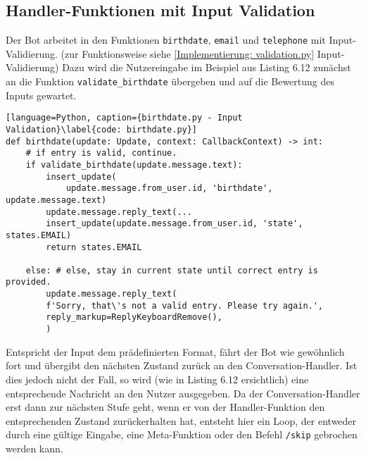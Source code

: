         \subsection{Handler-Funktionen mit Input Validation} \label{Implementierung: handler validation}
            Der Bot arbeitet in den Funktionen \verb|birthdate|, \verb|email| und \verb|telephone| mit Input-Validierung. (zur Funktionsweise siehe \ref{Implementierung: validation.py} Input-Validierung) Dazu wird die Nutzereingabe im Beispiel aus Listing 6.12 zunächst an die Funktion \verb|validate_birthdate| übergeben und auf die Bewertung des Inputs gewartet. 
            \begin{lstlisting}[language=Python, caption={birthdate.py - Input Validation}\label{code: birthdate.py}]
def birthdate(update: Update, context: CallbackContext) -> int:
    # if entry is valid, continue.
    if validate_birthdate(update.message.text): 
        insert_update(
            update.message.from_user.id, 'birthdate', update.message.text)
        update.message.reply_text(...
        insert_update(update.message.from_user.id, 'state', states.EMAIL)
        return states.EMAIL

    else: # else, stay in current state until correct entry is provided.
        update.message.reply_text(
        f'Sorry, that\'s not a valid entry. Please try again.',
        reply_markup=ReplyKeyboardRemove(),
        )
            \end{lstlisting}
                
            Entspricht der Input dem prädefinierten Format, fährt der Bot wie gewöhnlich fort und übergibt den nächsten Zustand zurück an den Conversation-Handler. Ist dies jedoch nicht der Fall, so wird (wie in Listing 6.12 ersichtlich) eine entsprechende Nachricht an den Nutzer ausgegeben. Da der Conversation-Handler erst dann zur nächsten Stufe geht, wenn er von der Handler-Funktion den entsprechenden Zustand zurückerhalten hat, entsteht hier ein Loop, der entweder durch eine gültige Eingabe, eine Meta-Funktion oder den Befehl \verb|/skip| gebrochen werden kann.
        
            

